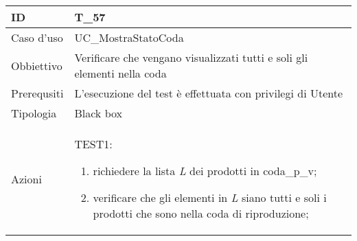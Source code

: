 \begin{table}[hb]
    \centering
    \begin{tabular}{ |p{2cm}|p{10cm}|  }
        \hline
        ID          & T\_57                                                                 \\\hline
        Caso d'uso  & UC\_MostraStatoCoda                                                    \\\hline
        Obbiettivo  & Verificare che vengano visualizzati tutti e soli gli elementi nella coda \\\hline
        Prerequsiti & L'esecuzione del test è effettuata con privilegi di Utente            \\\hline
        Tipologia   & Black box                                                             \\\hline
        Azioni      &
        TEST1:
        \begin{enumerate}[nosep, topsep=0pt]
            \item richiedere la lista \emph{L} dei prodotti in coda\_p\_v;
            \item verificare che gli elementi in \emph{L} siano tutti e soli i prodotti che sono nella
            coda di riproduzione;
        \end{enumerate}
        \\\hline
    \end{tabular}
\end{table}

